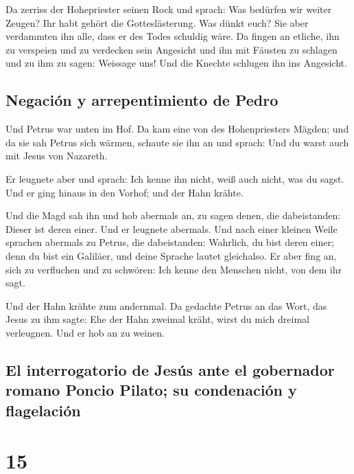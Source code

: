  Da zerriss der Hohepriester seinen Rock und sprach: Was
bedürfen wir weiter Zeugen?  Ihr habt gehört die
Gotteslästerung. Was dünkt euch? Sie aber verdammten ihn alle, dass er
des Todes schuldig wäre.  Da fingen an etliche, ihn zu
verspeien und zu verdecken sein Angesicht und ihn mit Fäusten zu
schlagen und zu ihm zu sagen: Weissage uns! Und die Knechte schlugen ihn
ins Angesicht.

\hypertarget{negaciuxf3n-y-arrepentimiento-de-pedro}{%
\subsection{Negación y arrepentimiento de
Pedro}\label{negaciuxf3n-y-arrepentimiento-de-pedro}}

 Und Petrus war unten im Hof. Da kam eine von des
Hohenpriesters Mägden;  und da sie sah Petrus sich
wärmen, schaute sie ihn an und sprach: Und du warst auch mit Jesus von
Nazareth.

 Er leugnete aber und sprach: Ich kenne ihn nicht, weiß
auch nicht, was du sagst. Und er ging hinaus in den Vorhof; und der Hahn
krähte.

 Und die Magd sah ihn und hob abermals an, zu sagen
denen, die dabeistanden: Dieser ist deren einer.  Und er
leugnete abermals. Und nach einer kleinen Weile sprachen abermals zu
Petrus, die dabeistanden: Wahrlich, du bist deren einer; denn du bist
ein Galiläer, und deine Sprache lautet gleichalso.  Er
aber fing an, sich zu verfluchen und zu schwören: Ich kenne den Menschen
nicht, von dem ihr sagt.

 Und der Hahn krähte zum andernmal. Da gedachte Petrus an
das Wort, das Jesus zu ihm sagte: Ehe der Hahn zweimal kräht, wirst du
mich dreimal verleugnen. Und er hob an zu weinen.

\hypertarget{el-interrogatorio-de-jesuxfas-ante-el-gobernador-romano-poncio-pilato-su-condenaciuxf3n-y-flagelaciuxf3n}{%
\subsection{El interrogatorio de Jesús ante el gobernador romano Poncio
Pilato; su condenación y
flagelación}\label{el-interrogatorio-de-jesuxfas-ante-el-gobernador-romano-poncio-pilato-su-condenaciuxf3n-y-flagelaciuxf3n}}

\hypertarget{section-14}{%
\section{15}\label{section-14}}

